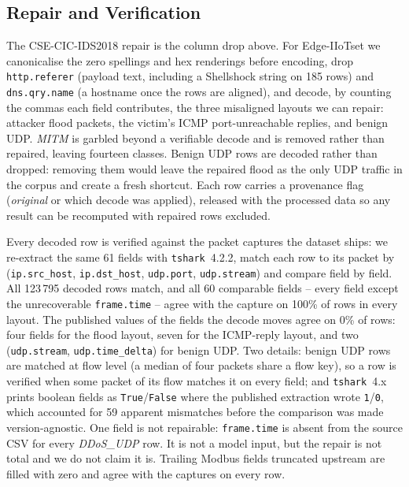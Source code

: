 \subsection{Repair and Verification}
\label{subsec:repair}

The \mbox{CSE-CIC-IDS2018} repair is the column drop above. For Edge-IIoTset we
canonicalise the zero spellings and hex renderings before encoding, drop
\texttt{http.referer} (payload text, including a Shellshock string on 185 rows)
and \texttt{dns.qry.name} (a hostname once the rows are aligned), and decode, by
counting the commas each field contributes, the three misaligned layouts we can
repair: attacker flood packets, the victim's ICMP port-unreachable replies, and
benign UDP. \emph{MITM} is garbled beyond a verifiable decode and is removed
rather than repaired, leaving fourteen classes. Benign UDP rows are decoded
rather than dropped: removing them
would leave the repaired flood as the only UDP traffic in the corpus and create a
fresh shortcut. Each row carries a provenance flag (\emph{original} or which
decode was applied), released with the processed data so any result can be
recomputed with repaired rows excluded.

Every decoded row is verified against the packet captures the dataset ships: we
re-extract the same 61 fields with \texttt{tshark}~4.2.2, match each row to its
packet by (\texttt{ip.src\_host}, \texttt{ip.dst\_host}, \texttt{udp.port},
\texttt{udp.stream}) and compare field by field. All 123\,795 decoded rows match,
and all 60 comparable fields -- every field except the unrecoverable
\texttt{frame.time} -- agree with the capture on 100\% of rows in every layout.
The published values of the fields the decode moves agree on 0\% of rows: four
fields for the flood layout, seven for the ICMP-reply layout, and two
(\texttt{udp.stream}, \texttt{udp.time\_delta}) for benign UDP. Two details: benign UDP rows are
matched at flow level (a median of four packets share a flow key), so a row is
verified when some packet of its flow matches it on every field; and
\texttt{tshark}~4.x prints boolean fields as \texttt{True}/\texttt{False} where
the published extraction wrote \texttt{1}/\texttt{0}, which accounted for 59
apparent mismatches before the comparison was made version-agnostic. One field is
not repairable: \texttt{frame.time} is absent from the source CSV for every
\emph{DDoS\_UDP} row. It is not a model input, but the repair is not total and we
do not claim it is. Trailing Modbus fields truncated upstream are filled with
zero and agree with the captures on every row.

